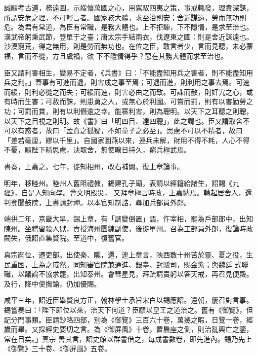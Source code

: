 \begin{pinyinscope}
 誠願考古道，務遠圖，示綏懷萬國之心，用駕馭四夷之策，事戒輒發，理貴深謀，所謂安危之理，不可輕言者。國家務大體，求至治則安；舍近謀遠，勞而無功則危。為君有常道，為臣有常職，是務大體也。上不拒諫，下不隱情，是求至治也。漢武帝躬秉武節，登單于之臺；唐太宗手結雨衣，伐遼東之國：則是舍近謀遠也。沙漠窮荒，得之無用，則是勞而無功也。在位之臣，敢言者少，言而見聽，未必蒙福，言而不從，方且虞禍，欲
 下不隱情得乎？惡在其務大體而求至治也。



 臣又謂利害相生，變易不定者，《兵書》曰：「不能盡知用兵之害者，則不能盡知用兵之利。」蓋事有可進而退，則害成之事至焉；可退而進，則利用之事去焉。可速而緩，則利必從之而失；可緩而速，則害必由之而致。可誅而赦，則奸宄之心，或有時而生害；可赦而誅，則患勇之人，或無心於利國。可賞而罰，則有以害勤勞之功；可罰而賞，則有以利僭逾之幸。能審利害，則為聰明。以天下之耳聽之則聰，
 以天下之目視之則明。故《書》曰「明四目、達四聰」，此之謂也。臣又謂取舍不可以有惑者，故曰「孟賁之狐疑，不如童子之必至」。思慮不可以不精者，故曰「差若毫厘，繆以千里」。自國家圖燕以來，連兵未解，財用不得不耗，人心不得不憂，願陛下精思慮，決取舍，無使曠日持久，窮兵極武焉。



 書奏，上嘉之。七年，徙知相州，改右補闕。復上章論事。



 明年，移睦州。睦州人舊阻禮教，錫建孔子廟，表請以經籍給諸生，詔賜《九經》，自是人知向學。會文明殿災，
 又拜章極言時政，上嘉納焉。轉起居舍人，還判登聞鼓院，上書請封禪。以本官知制誥，尋加兵部員外郎。



 端拱二年，京畿大旱，錫上章，有「調變倒置」語，忤宰相，罷為戶部郎中，出知陳州。坐稽留殺人獄，責授海州團練副使，後徙單州。召為工部員外郎，復論時政闕失，俄詔直集賢院。至道中，復舊官。



 真宗嗣位，遷吏部。出使秦、隴，還，連上章言，陜西數十州苦於靈、夏之役，生民重困，上為之戚然。同知審官院兼通進、銀臺、封駁司，賜金紫；與魏廷
 式聯職，以議論不協求罷，出知泰州。會彗星見，拜疏請責躬以答天戒，再召見便殿。及行，降中使撫諭，仍加優賜。



 咸平三年，詔近臣舉賢良方正，翰林學士承旨宋白以錫應詔。還朝，屢召對言事。錫嘗奏曰：「陛下即位以來，治天下何道？臣願以皇王之道治之。舊有《御覽》，但記分門事類。臣請鈔略四部，別為《御覽》三百六十卷，萬幾之暇，日覽一卷，經歲而畢。又採經史要切之言。為《御屏風》十卷，置扆座之側，則治亂興亡之鑒，常在目矣。」真宗
 善其言，詔史館以群書借之，每成書數卷，即先進內。錫乃先上《御覽》三十卷、《御屏風》五卷。




\end{pinyinscope}
